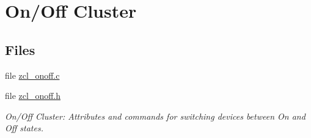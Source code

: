\hypertarget{group__zcl__onoff}{}\section{On/\+Off Cluster}
\label{group__zcl__onoff}
\subsection*{Files}
\begin{DoxyCompactItemize}
\item 
file \hyperlink{zcl__onoff_8c}{zcl\+\_\+onoff.\+c}
\item 
file \hyperlink{zcl__onoff_8h}{zcl\+\_\+onoff.\+h}
\begin{DoxyCompactList}\small\item\em On/\+Off Cluster\+: Attributes and commands for switching devices between \textquotesingle{}On\textquotesingle{} and \textquotesingle{}Off\textquotesingle{} states. \end{DoxyCompactList}\end{DoxyCompactItemize}
